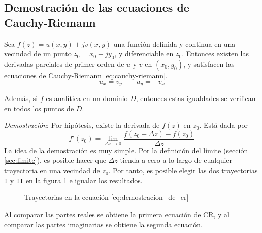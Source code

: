 \subsection[Demostración de las ecuaciones de Cauchy-Riemann]{Demostración de las ecuaciones de\\Cauchy-Riemann}

\begin{theorem}\label{teo:ecuaciones_de_cr}
Sea $f(z) = u(x, y) + jv(x, y)$ una función definida y continua en una vecindad de un punto $z_0 = x_0 + jy_0$, y diferenciable en $z_0$.  
Entonces existen las derivadas parciales de primer orden de $u$ y $v$ en $(x_0, y_0)$, y satisfacen las ecuaciones de Cauchy-Riemann \ref{eq:cauchy-riemann}.
\begin{equation*}
  u_x=v_y \qquad u_y=-v_x
\end{equation*}

Además, si $f$ es analítica en un dominio $D$, entonces estas igualdades se verifican en todos los puntos de $D$.
\end{theorem}

\textit{Demostración}: Por hipótesis, existe la derivada de $f(z)$ en $z_0$. Está dada por
\begin{equation}\label{eq:demostracion_de_cr}
  f'(z_0)=\lim_{\Delta z \to 0} \frac{f(z_0+\Delta z)-f(z_0)}{\Delta z}
\end{equation}
La idea de la demostración es muy simple. Por la definición del límite (sección \ref{sec:limite}), es posible hacer que $\Delta z$ tienda a cero a lo largo de cualquier trayectoria en una vecindad de $z_0$. Por tanto, es posible elegir las dos trayectorias \texttt{I} y \texttt{II} en la figura \ref{fig:trayectorias_de_demostracion_de_cr} e igualar los resultados.
\begin{figure}[ht]
  \centering
  \caption{Trayectorias en la ecuación \ref{eq:demostracion_de_cr}}
  \label{fig:trayectorias_de_demostracion_de_cr}
\end{figure}
Al comparar las partes reales se obtiene la primera ecuación de CR, y al comparar las partes imaginarias se obtiene la segunda ecuación.

